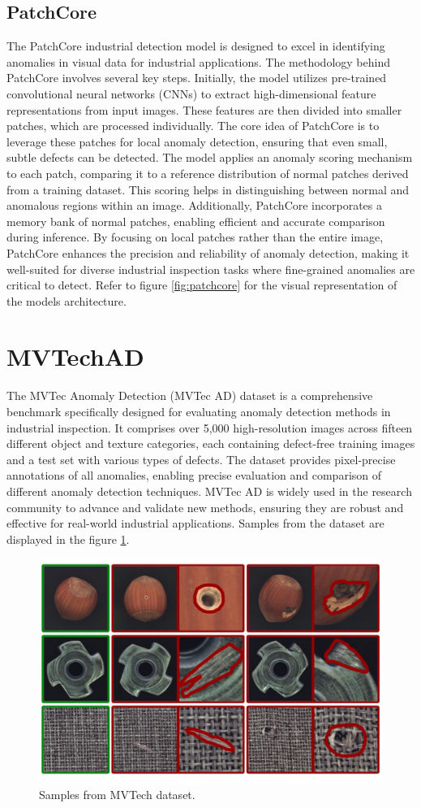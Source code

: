 \subsection{PatchCore}
\label{patchcore}
The PatchCore\cite{patchcore} industrial detection model is designed to excel in identifying anomalies in visual data for industrial applications. The methodology behind PatchCore involves several key steps. Initially, the model utilizes pre-trained convolutional neural networks (CNNs) to extract high-dimensional feature representations from input images\cite{patchcore}. These features are then divided into smaller patches, which are processed individually. The core idea of PatchCore is to leverage these patches for local anomaly detection, ensuring that even small, subtle defects can be detected\cite{patchcore}. The model applies an anomaly scoring mechanism to each patch, comparing it to a reference distribution of normal patches derived from a training dataset\cite{patchcore}. This scoring helps in distinguishing between normal and anomalous regions within an image. Additionally, PatchCore incorporates a memory bank of normal patches, enabling efficient and accurate comparison during inference\cite{patchcore}. By focusing on local patches rather than the entire image, PatchCore enhances the precision and reliability of anomaly detection, making it well-suited for diverse industrial inspection tasks where fine-grained anomalies are critical to detect\cite{patchcore}. Refer to figure \ref{fig:patchcore} for the visual representation of the models architecture.

\section{MVTechAD}
\label{mvtech}
The MVTec Anomaly Detection (MVTec AD) dataset is a comprehensive benchmark specifically designed for evaluating anomaly detection methods in industrial inspection\cite{mvtecad}. It comprises over 5,000 high-resolution images across fifteen different object and texture categories, each containing defect-free training images and a test set with various types of defects\cite{mvtecad}. The dataset provides pixel-precise annotations of all anomalies, enabling precise evaluation and comparison of different anomaly detection techniques. MVTec AD is widely used in the research community to advance and validate new methods, ensuring they are robust and effective for real-world industrial applications. Samples from the dataset are displayed in the figure \ref{fig:mvtec}.

\begin{figure}[t]
	\begin{center}
		\includegraphics[width=0.7\linewidth]{Chapter_2/mvtec.jpg}
	\end{center}
	\caption{Samples from MVTech dataset.\cite{mvtecad}}
	\label{fig:mvtec}
\end{figure}

